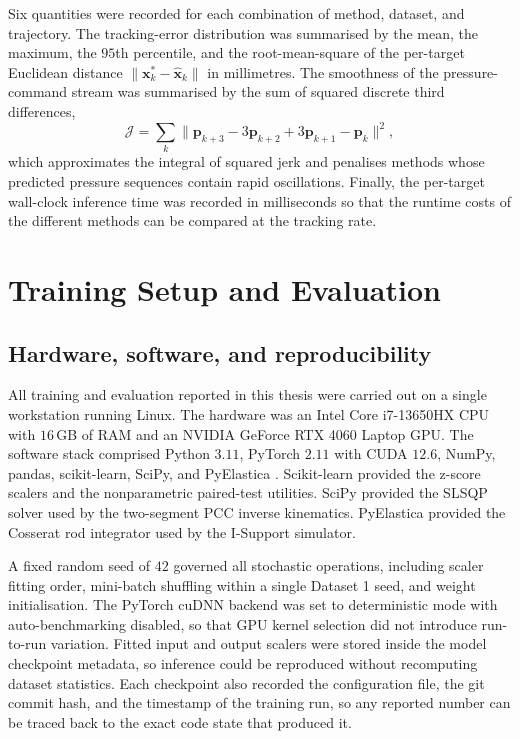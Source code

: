 Six quantities were recorded for each combination of method, dataset, and trajectory. The tracking-error distribution was summarised by the mean, the maximum, the $95$th percentile, and the root-mean-square of the per-target Euclidean distance $\| \mathbf{x}^{*}_k - \hat{\mathbf{x}}_k \|$ in millimetres. The smoothness of the pressure-command stream was summarised by the sum of squared discrete third differences,
\begin{equation}
  \mathcal{J} = \sum_{k} \bigl\| \mathbf{p}_{k+3} - 3 \mathbf{p}_{k+2} + 3 \mathbf{p}_{k+1} - \mathbf{p}_k \bigr\|^{2}, \label{eq:traj_jerk}
\end{equation}
which approximates the integral of squared jerk and penalises methods whose predicted pressure sequences contain rapid oscillations. Finally, the per-target wall-clock inference time was recorded in milliseconds so that the runtime costs of the different methods can be compared at the tracking rate.

\section{Training Setup and Evaluation}

\subsection{Hardware, software, and reproducibility}
\label{sec:reproducibility}

All training and evaluation reported in this thesis were carried out on a single workstation running Linux. The hardware was an Intel Core i7-13650HX CPU with $16$\,GB of RAM and an NVIDIA GeForce RTX 4060 Laptop GPU. The software stack comprised Python $3.11$, PyTorch $2.11$ with CUDA $12.6$, NumPy, pandas, scikit-learn, SciPy, and PyElastica \cite{gazzola2018pyelastica}. Scikit-learn provided the z-score scalers and the nonparametric paired-test utilities. SciPy provided the SLSQP solver used by the two-segment PCC inverse kinematics. PyElastica provided the Cosserat rod integrator used by the I-Support simulator.

A fixed random seed of $42$ governed all stochastic operations, including scaler fitting order, mini-batch shuffling within a single Dataset 1 seed, and weight initialisation. The PyTorch cuDNN backend was set to deterministic mode with auto-benchmarking disabled, so that GPU kernel selection did not introduce run-to-run variation. Fitted input and output scalers were stored inside the model checkpoint metadata, so inference could be reproduced without recomputing dataset statistics. Each checkpoint also recorded the configuration file, the git commit hash, and the timestamp of the training run, so any reported number can be traced back to the exact code state that produced it.

